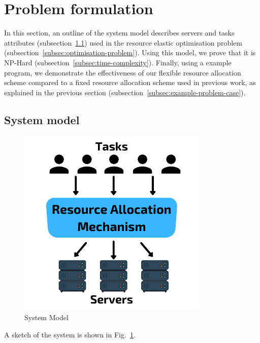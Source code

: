 \section{Problem formulation}
\label{sec:problem-formulation}
In this section, an outline of the system model describes servers and tasks attributes
(subsection~\ref{subsec:system-model}) used in the resource elastic optimisation problem
(subsection~\ref{subsec:optimisation-problem}). Using this model, we prove that it is NP-Hard
(subsection~\ref{subsec:time-complexity}). Finally, using a example program, we demonstrate the effectiveness of our
flexible resource allocation scheme compared to a fixed resource allocation scheme used in previous work, as explained
in the previous section (subsection~\ref{subsec:example-problem-case}).

\subsection{System model}\label{subsec:system-model}
\begin{figure}
    \centering
    \includegraphics[width=\linewidth]{figs/system_model.pdf}
    \caption{System Model}
    \label{fig:system-model}
\end{figure}
A sketch of the system is shown in Fig.~\ref{fig:system-model}.
